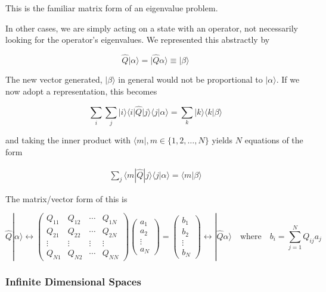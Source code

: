 This is the familiar matrix form of an eigenvalue problem. 

In other cases, we are simply acting on a state with an operator, not
necessarily looking for the operator's eigenvalues. We represented this
abstractly by 

\[
\hat{Q}|\alpha \rangle = |\hat{Q}\alpha \rangle \equiv |\beta\rangle
\] \vspace{3px}

The new vector generated, $| \beta \rangle$ in general would not be
proportional to $|\alpha\rangle$. If we now adopt a representation, this
becomes 

\[
\sum_{i}^{}  \sum_{j}^{} |i\rangle \langle i | \hat{Q} | j \rangle \langle
j | \alpha \rangle = \sum_{k}^{} |k\rangle \langle k | \beta \rangle
\] \vspace{3px}

and taking the inner product with $\langle m |, m \in \{1, 2, \hdots, N\}$
yields $N$ equations of the form 

\begin{align}
\sum_{j}^{} \langle m | \hat{Q} | j \rangle \langle j | \alpha \rangle
= \langle m | \beta \rangle 
\end{align} \vspace{3px}

The matrix/vector form of this is 


\[
\hat{Q}| \alpha \rangle \leftrightarrow \begin{pmatrix}
  Q_{11} & Q_{12} & \cdots & Q_{1N} \\ Q_{21} & Q_{22} & \cdots & Q_{2N} \\
  \vdots & \vdots & \vdots & \vdots \\ Q_{N1} & Q_{N2} & \cdots & Q_{NN}
\end{pmatrix} \begin{pmatrix}
  a_1 \\ a_2 \\ \vdots \\ a_N
\end{pmatrix} = \begin{pmatrix}
  b_1 \\ b_2 \\ \vdots \\ b_N
\end{pmatrix}  \leftrightarrow |\hat{Q} \alpha\rangle \quad \text{where} \quad
b_i = \sum_{j=1}^{N} Q_{ij}a_j
\] \vspace{3px}

\subsubsection{Infinite Dimensional Spaces}

